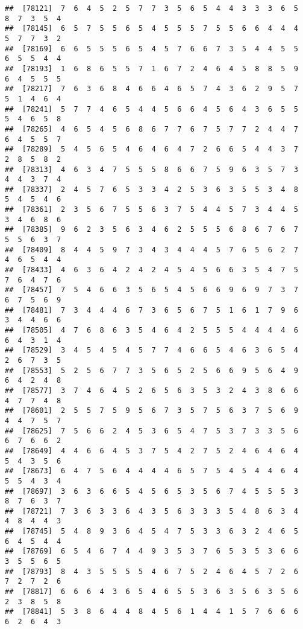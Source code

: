 \documentclass[
]{book}
\begin{document}
\begin{verbatim}
##  [78121]  7  6  4  5  2  5  7  7  3  5  6  5  4  4  3  3  3  6  5  8  7  3  5  4
##  [78145]  6  5  7  5  5  6  5  4  5  5  5  7  5  5  6  6  4  4  4  5  7  7  3  2
##  [78169]  6  6  5  5  5  6  5  4  5  7  6  6  7  3  5  4  4  5  5  6  5  5  4  4
##  [78193]  1  6  8  6  5  5  7  1  6  7  2  4  6  4  5  8  8  5  9  6  4  5  5  5
##  [78217]  7  6  3  6  8  4  6  6  4  6  5  7  4  3  6  2  9  5  7  5  1  4  6  4
##  [78241]  5  7  7  4  6  5  4  4  5  6  6  4  5  6  4  3  6  5  5  5  4  6  5  8
##  [78265]  4  6  5  4  5  6  8  6  7  7  6  7  5  7  7  2  4  4  7  6  4  5  5  7
##  [78289]  5  4  5  6  5  4  6  4  6  4  7  2  6  6  5  4  4  3  7  2  8  5  8  2
##  [78313]  4  6  3  4  7  5  5  5  8  6  6  7  5  9  6  3  5  7  3  4  4  3  7  4
##  [78337]  2  4  5  7  6  5  3  3  4  2  5  3  6  3  5  5  3  4  8  5  4  5  4  6
##  [78361]  2  3  5  6  7  5  5  6  3  7  5  4  4  5  7  3  4  4  5  3  4  6  8  6
##  [78385]  9  6  2  3  5  6  3  4  6  2  5  5  5  6  8  6  7  6  7  5  5  6  3  7
##  [78409]  8  4  4  5  9  7  3  4  3  4  4  4  5  7  6  5  6  2  7  4  6  5  4  4
##  [78433]  4  6  3  6  4  2  4  2  4  5  4  5  6  6  3  5  4  7  5  7  6  4  7  6
##  [78457]  7  5  4  6  6  3  5  6  5  4  5  6  6  9  6  9  7  3  7  6  7  5  6  9
##  [78481]  7  3  4  4  4  6  7  3  6  5  6  7  5  1  6  1  7  9  6  3  4  4  6  6
##  [78505]  4  7  6  8  6  3  5  4  6  4  2  5  5  5  4  4  4  4  6  6  4  3  1  4
##  [78529]  3  4  5  4  5  4  5  7  7  4  6  6  5  4  6  3  6  5  4  2  6  7  3  5
##  [78553]  5  2  5  6  7  7  3  5  6  5  2  5  6  6  9  5  6  4  9  6  4  2  4  8
##  [78577]  3  7  4  6  4  5  2  6  5  6  3  5  3  2  4  3  8  6  6  4  7  7  4  8
##  [78601]  2  5  5  7  5  9  5  6  7  3  5  7  5  6  3  7  5  6  9  4  4  7  5  7
##  [78625]  7  5  6  6  2  4  5  3  6  5  4  7  5  3  7  3  3  5  6  6  7  6  6  2
##  [78649]  4  4  6  6  4  5  3  7  5  4  2  7  5  2  4  6  4  6  4  5  4  3  5  6
##  [78673]  6  4  7  5  6  4  4  4  4  6  5  7  5  4  5  4  4  6  4  5  5  4  3  4
##  [78697]  3  6  3  6  6  5  4  5  6  5  3  5  6  7  4  5  5  5  3  8  7  6  3  7
##  [78721]  7  3  6  3  3  6  4  3  5  6  3  3  3  5  4  8  6  3  4  4  8  4  4  3
##  [78745]  5  4  8  9  3  6  4  5  4  7  5  3  3  6  3  2  4  6  5  6  4  5  4  4
##  [78769]  6  5  4  6  7  4  4  9  3  5  3  7  6  5  3  5  3  6  6  3  5  5  6  5
##  [78793]  8  4  3  5  5  5  5  4  6  7  5  2  4  6  4  5  7  2  6  7  2  7  2  6
##  [78817]  6  6  6  4  3  6  5  4  6  5  5  3  6  3  5  6  3  5  6  2  3  8  5  8
##  [78841]  5  3  8  6  4  4  8  4  5  6  1  4  4  1  5  7  6  6  6  6  2  6  4  3

\end{verbatim}
\end{document}
